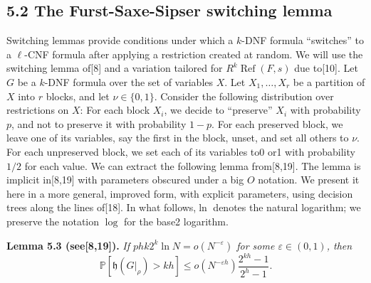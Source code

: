 \documentclass[10pt,a4paper]{article}
\renewcommand{\Ref}{\operatorname{Ref}}
\newcommand{\height}{\mathfrak h}
\newcommand{\bits}{\{0,1\}}
\newenvironment{originalresult}[1]{\par\medskip\noindent\textbf{#1.}\itshape}{\par\medskip}
\begin{document}
\subsection*{5.2 The Furst-Saxe-Sipser switching lemma}
Switching lemmas provide conditions under which a $k$-DNF formula ``switches'' to a $\ell$-CNF formula after applying a restriction created at random. We will use the switching lemma of[8] and a variation tailored for $R^k\Ref(F,s)$ due to[10].
Let $G$ be a $k$-DNF formula over the set of variables $X$. Let $X_1,\ldots,X_r$ be a partition of $X$ into $r$ blocks, and let $\nu\in\bits$. Consider the following distribution over restrictions on $X$: For each block $X_i$, we decide to ``preserve'' $X_i$ with probability $p$, and not to preserve it with probability $1-p$. For each preserved block, we leave one of its variables, say the first in the block, unset, and set all others to $\nu$. For each unpreserved block, we set each of its variables to0 or1 with probability $1/2$ for each value.
We can extract the following lemma from[8,19]. The lemma is implicit in[8,19] with parameters obscured under a big $O$ notation. We present it here in a more general, improved form, with explicit parameters, using decision trees along the lines of[18]. In what follows,$\ln$ denotes the natural logarithm; we preserve the notation $\log$ for the base2 logarithm.
\begin{originalresult}{Lemma 5.3 (see[8,19])}
If $phk2^k\ln N=o(N^{-\varepsilon})$ for some $\varepsilon\in(0,1)$, then
\[\mathbb P[\height(G|_\rho)>kh]\le o(N^{-\varepsilon h})\frac{2^{kh}-1}{2^h-1}.\]
\end{originalresult}
\end{document}
